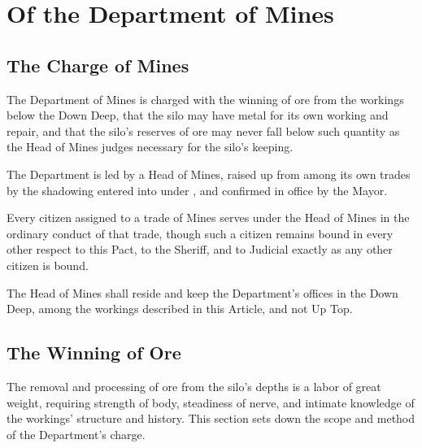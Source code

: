 \chapter{Of the Department of Mines}
\label{art:mines}


\section{The Charge of Mines}
\label{sec:mines:charge-of-mines}

The Department of Mines is charged with the winning of ore from the workings below the Down Deep, that the silo may have metal for its own working and repair, and that the silo's reserves of ore may never fall below such quantity as the Head of Mines judges necessary for the silo's keeping.

\begin{clauses}
\item The Department is led by a Head of Mines, raised up from among its own trades by the shadowing entered into under , and confirmed in office by the Mayor.
\item Every citizen assigned to a trade of Mines serves under the Head of Mines in the ordinary conduct of that trade, though such a citizen remains bound in every other respect to this Pact, to the Sheriff, and to Judicial exactly as any other citizen is bound.
\item The Head of Mines shall reside and keep the Department's offices in the Down Deep, among the workings described in this Article, and not Up Top.
\end{clauses}

\section{The Winning of Ore}
\label{sec:mines:winning-of-ore}

The removal and processing of ore from the silo's depths is a labor of great weight, requiring strength of body, steadiness of nerve, and intimate knowledge of the workings' structure and history. This section sets down the scope and method of the Department's charge.

